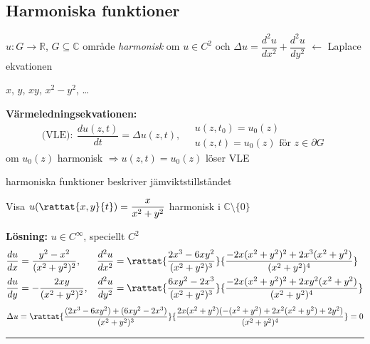 \subsection{Harmoniska funktioner}
\begin{definition}
$u : G \to \mathbb{R}$, $G \subseteq \mathbb{C}$ område \emph{harmonisk} om $u \in C^2$ och $\Delta u = \dfrac{d^2u}{dx^2} + \dfrac{d^2u}{dy^2}$ \quad \textcolor{magenta!80!black}{$\leftarrow$ Laplace ekvationen}
\end{definition}

\begin{example}
$x$, $y$, $xy$, $x^2 - y^2$, \dots
\end{example}

\textbf{Värmeledningsekvationen:}
\[ \text{(VLE)}: \ \frac{du(z, t)}{dt} = \Delta u(z, t), \quad \begin{array}{l} u(z, t_0) = u_0(z) \\ u(z, t) = u_0(z) \text{ för } z \in \partial G \end{array} \]
om $u_0(z)$ harmonisk $\Rightarrow u(z, t) = u_0(z)$ löser VLE

harmoniska funktioner beskriver jämviktstillståndet

\begin{example}
Visa $u(\rattat{x, y}{t}) = \dfrac{x}{x^2 + y^2}$ harmonisk i $\mathbb{C} \setminus \{0\}$

\textbf{Lösning:} $u \in C^\infty$, speciellt $C^2$
\begin{align*}
  \frac{du}{dx} &= \frac{y^2 - x^2}{(x^2 + y^2)^2}, & \frac{d^2u}{dx^2} &= \rattat{\frac{2x^3 - 6xy^2}{(x^2 + y^2)^3}}{\frac{-2x(x^2 + y^2)^2 + 2x^3(x^2 + y^2)}{(x^2 + y^2)^4}} \\
  \frac{du}{dy} &= -\frac{2xy}{(x^2 + y^2)^2}, & \frac{d^2u}{dy^2} &= \rattat{\frac{6xy^2 - 2x^3}{(x^2 + y^2)^3}}{\frac{-2x(x^2 + y^2)^2 + 2xy^2(x^2 + y^2)}{(x^2 + y^2)^4}}
\end{align*}
\[ \Delta u = \rattat{\frac{(2x^3 - 6xy^2) + (6xy^2 - 2x^3)}{(x^2 + y^2)^3}}{\frac{2x(x^2 + y^2)(-(x^2 + y^2) + 2x^2(x^2 + y^2) + 2y^2)}{(x^2 + y^2)^4}} = 0 \]
\end{example}

\noindent\rule{\linewidth}{0.4pt}

